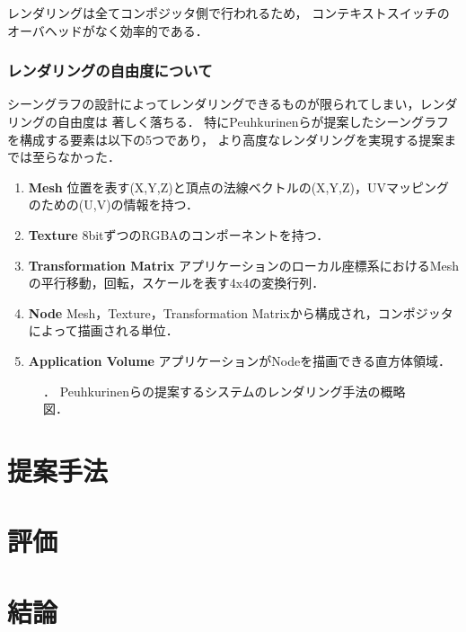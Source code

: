 レンダリングは全てコンポジッタ側で行われるため，
コンテキストスイッチのオーバヘッドがなく効率的である．

\subsubsection*{レンダリングの自由度について}

シーングラフの設計によってレンダリングできるものが限られてしまい，レンダリングの自由度は
著しく落ちる．
特にPeuhkurinenらが提案したシーングラフを構成する要素は以下の5つであり，
より高度なレンダリングを実現する提案までは至らなかった．

\begin{enumerate}
  \item \textbf{Mesh}
        位置を表す(X,Y,Z)と頂点の法線ベクトルの(X,Y,Z)，UVマッピングのための(U,V)の情報を持つ．
  \item \textbf{Texture}
        8bitずつのRGBAのコンポーネントを持つ．
  \item \textbf{Transformation Matrix}
        アプリケーションのローカル座標系におけるMeshの平行移動，回転，スケールを表す4x4の変換行列．
  \item \textbf{Node}
        Mesh，Texture，Transformation Matrixから構成され，コンポジッタによって描画される単位．
  \item \textbf{Application Volume}
        アプリケーションがNodeを描画できる直方体領域．
\end{enumerate}

\begin{figure}[htbp]
  \centering
  \caption{．
    Peuhkurinenら\cite{peuhkurinen}の提案するシステムのレンダリング手法の概略図．
  }
  \label{fig:peuhkurinen-rendering}
\end{figure}


\section{提案手法}


\section{評価}


\section{結論}

